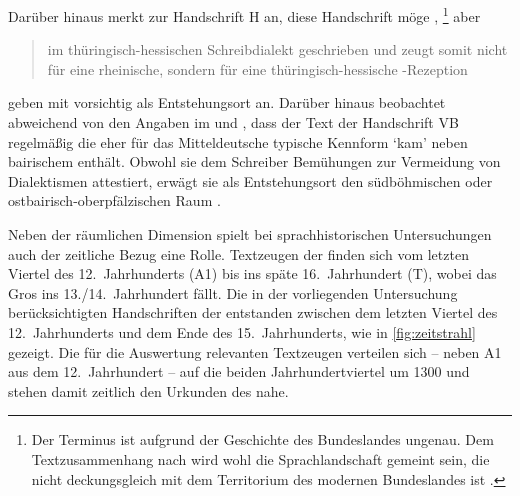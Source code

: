 Darüber hinaus merkt \citet{klein1988} zur Handschrift H an, diese
Handschrift möge ,%
%
	\footnote{Der Terminus  ist aufgrund der Geschichte des
	Bundeslandes ungenau. Dem Textzusammenhang nach wird wohl die
	Sprachlandschaft gemeint sein, die nicht deckungsgleich mit dem Territorium
	des modernen Bundeslandes ist \autocite[vgl.~z.\,B.][853]{wiesinger1983}.}
%
aber \blockcquote[118]{klein1988}{im thüringisch-hessischen Schreibdialekt
geschrieben und zeugt somit nicht für eine rheinische, sondern für eine
thüringisch-hessische \nocite{schroeder1895}-Rezeption}.
\textcites{kcdigital}[23]{wolf:kckat} geben mit
\citet[237--238]{millerzimmermann2007} vorsichtig  als
Entstehungsort an.
%
\label{phsec:vbherkunft}%
Darüber hinaus beobachtet \citeauthor{schneider1987} abweichend von den
Angaben im  und \citet{kcdigital}, dass der Text der Handschrift
VB regelmäßig die eher für das Mitteldeutsche typische Kennform
 `kam' neben bairischem  enthält. Obwohl sie dem
Schreiber Bemühungen zur Vermeidung von Dialektismen attestiert, erwägt sie als
Entstehungsort den südböhmischen oder ostbairisch-oberpfälzischen Raum
\autocite[226]{schneider1987}.

Neben der räumlichen Dimension spielt bei sprachhistorischen Untersuchungen
auch der zeitliche Bezug eine Rolle. Textzeugen der \KC{} finden sich vom
letzten Viertel des 12.~Jahrhunderts (A1) bis ins späte
16.~Jahrhundert (T), wobei das Gros ins 13./14.~Jahrhundert fällt.
Die in der vorliegenden Untersuchung berücksichtigten Handschriften der
\KC{} entstanden zwischen dem letzten Viertel des 12.~Jahrhunderts und dem
Ende des 15.~Jahrhunderts, wie in \cref{fig:zeitstrahl} gezeigt. Die für die
Auswertung relevanten Textzeugen verteilen sich -- neben A1 aus dem
12.~Jahrhundert -- auf die beiden Jahrhundertviertel um 1300 und stehen damit
zeitlich den Urkunden des \CAO{} nahe.

